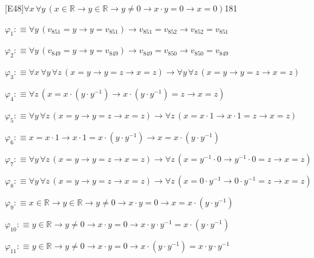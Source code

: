 \begin{fullproof}{[E48]}{$\forall x\,\forall y\,(x \in \mathbb{R} \to y \in \mathbb{R} \to y \neq 0 \to x \cdot y = 0 \to x = 0)$}{181}
\begin{ptree}
\noLine
{}
\noLine
{}
\end{ptree}
\begin{abbrevlist}
\item $\varphi_{1} :\equiv \forall y\,(v_{851} = y \to y = v_{851}) \to v_{851} = v_{852} \to v_{852} = v_{851}$
\item $\varphi_{2} :\equiv \forall y\,(v_{849} = y \to y = v_{849}) \to v_{849} = v_{850} \to v_{850} = v_{849}$
\item $\varphi_{3} :\equiv \forall x\,\forall y\,\forall z\,(x = y \to y = z \to x = z) \to \forall y\,\forall z\,(x = y \to y = z \to x = z)$
\item $\varphi_{4} :\equiv \forall z\,(x = x \cdot (y \cdot y^{-1}) \to x \cdot (y \cdot y^{-1}) = z \to x = z)$
\item $\varphi_{5} :\equiv \forall y\,\forall z\,(x = y \to y = z \to x = z) \to \forall z\,(x = x \cdot 1 \to x \cdot 1 = z \to x = z)$
\item $\varphi_{6} :\equiv x = x \cdot 1 \to x \cdot 1 = x \cdot (y \cdot y^{-1}) \to x = x \cdot (y \cdot y^{-1})$
\item $\varphi_{7} :\equiv \forall y\,\forall z\,(x = y \to y = z \to x = z) \to \forall z\,(x = y^{-1} \cdot 0 \to y^{-1} \cdot 0 = z \to x = z)$
\item $\varphi_{8} :\equiv \forall y\,\forall z\,(x = y \to y = z \to x = z) \to \forall z\,(x = 0 \cdot y^{-1} \to 0 \cdot y^{-1} = z \to x = z)$
\item $\varphi_{9} :\equiv x \in \mathbb{R} \to y \in \mathbb{R} \to y \neq 0 \to x \cdot y = 0 \to x = x \cdot (y \cdot y^{-1})$
\item $\varphi_{10} :\equiv y \in \mathbb{R} \to y \neq 0 \to x \cdot y = 0 \to x \cdot y \cdot y^{-1} = x \cdot (y \cdot y^{-1})$
\item $\varphi_{11} :\equiv y \in \mathbb{R} \to y \neq 0 \to x \cdot y = 0 \to x \cdot (y \cdot y^{-1}) = x \cdot y \cdot y^{-1}$

\end{abbrevlist}
\end{fullproof}
